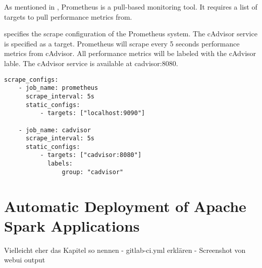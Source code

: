 


As mentioned in , Prometheus is a pull-based monitoring tool.
It requires a list of targets to pull performance metrics from.


 specifies the scrape configuration of the Prometheus system.
The cAdvisor service is specified as a target. Prometheus will scrape every 5 seconds performance metrics from cAdvisor. All performance metrics will be labeled with the cAdvisor lable. The cAdvisor service is available at  cadvisor:8080.


\begin{lstlisting}[label=lst:06_computing_am_prom-config, caption=Prometheus target configuration in YAML syntax]
scrape_configs:
    - job_name: prometheus
      scrape_interval: 5s
      static_configs:
          - targets: ["localhost:9090"]
 
    - job_name: cadvisor
      scrape_interval: 5s
      static_configs:
          - targets: ["cadvisor:8080"]
            labels:
                group: "cadvisor"
\end{lstlisting}


\section{Automatic Deployment of Apache Spark Applications}
Vielleicht eher das Kapitel so nennen
- gitlab-ci.yml erklären
- Screenshot von webui output
